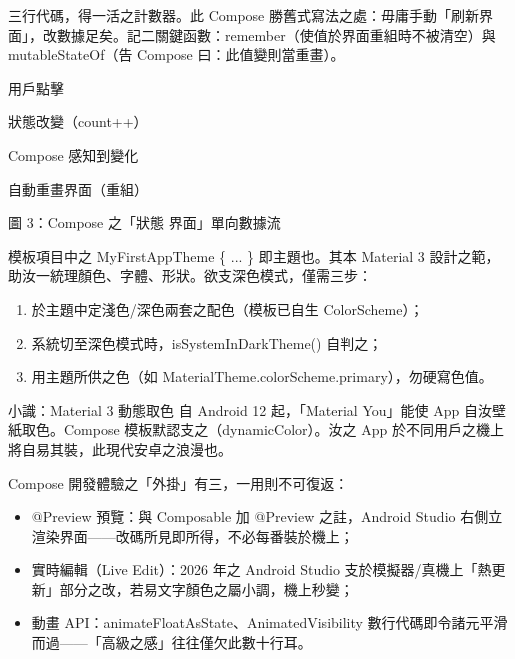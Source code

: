 三行代碼，得一活之計數器。此 Compose 勝舊式寫法之處：毋庸手動「刷新界面」，改數據足矣。記二關鍵函數：remember（使值於界面重組時不被清空）與 mutableStateOf（告 Compose 曰：此值變則當重畫）。

用戶點擊

狀態改變（count++）

Compose 感知到變化

自動重畫界面（重組）

\begin{center}\small\color{gray}圖 3：Compose 之「狀態 界面」單向數據流\end{center}


模板項目中之 MyFirstAppTheme \{ ... \} 即主題也。其本 Material 3 設計之範，助汝一統理顏色、字體、形狀。欲支深色模式，僅需三步：

\begin{enumerate}
  \item 於主題中定淺色/深色兩套之配色（模板已自生 ColorScheme）；
  \item 系統切至深色模式時，isSystemInDarkTheme() 自判之；
  \item 用主題所供之色（如 MaterialTheme.colorScheme.primary），勿硬寫色值。
\end{enumerate}

\begin{tcbinfo}{小識：Material 3 動態取色}
自 Android 12 起，「Material You」能使 App 自汝壁紙取色。Compose 模板默認支之（dynamicColor）。汝之 App 於不同用戶之機上將自易其裝，此現代安卓之浪漫也。

\end{tcbinfo}


Compose 開發體驗之「外掛」有三，一用則不可復返：

\begin{itemize}
  \item @Preview 預覽：與 Composable 加 @Preview 之註，Android Studio 右側立渲染界面——改碼所見即所得，不必每番裝於機上；
  \item 實時編輯（Live Edit）：2026 年之 Android Studio 支於模擬器/真機上「熱更新」部分之改，若易文字顏色之屬小調，機上秒變；
  \item 動畫 API：animateFloatAsState、AnimatedVisibility 數行代碼即令諸元平滑而過——「高級之感」往往僅欠此數十行耳。
\end{itemize}

